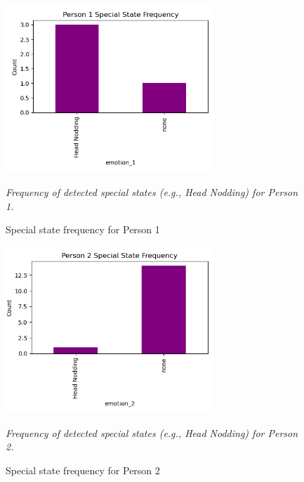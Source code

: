 \documentclass[12pt]{article}
\begin{document}
\begin{figure}[h!]
    \centering
    \includegraphics[width=0.7\textwidth]{model_analysis/Person 1_special_state_frequency.png}
    \caption{Special state frequency for Person 1}
    \textit{Frequency of detected special states (e.g., Head Nodding) for Person 1.}
\end{figure}
\begin{figure}[h!]
    \centering
    \includegraphics[width=0.7\textwidth]{model_analysis/Person 2_special_state_frequency.png}
    \caption{Special state frequency for Person 2}
    \textit{Frequency of detected special states (e.g., Head Nodding) for Person 2.}
\end{figure}
\end{document}
